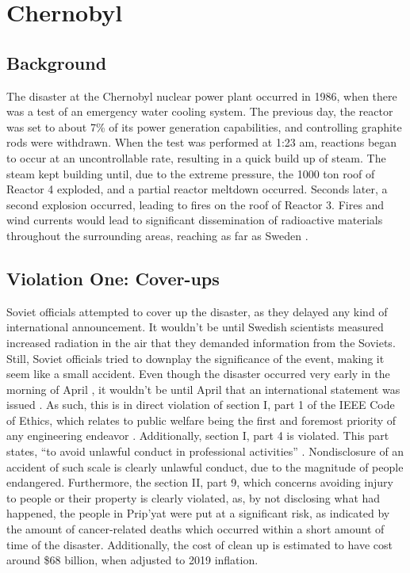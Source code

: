 \documentclass[conference]{IEEEtran}
\begin{document}
\section{Chernobyl}

\subsection{Background}

The disaster at the Chernobyl nuclear power plant occurred in 1986, when there was a test of an emergency water cooling system. The previous day, the reactor was set to about 7\% of its power generation capabilities, and controlling graphite rods were withdrawn. When the test was performed at 1:23 am, reactions began to occur at an uncontrollable rate, resulting in a quick build up of steam. The steam kept building until, due to the extreme pressure, the 1000 ton roof of Reactor 4 exploded, and a partial reactor meltdown occurred. Seconds later, a second explosion occurred, leading to fires on the roof of Reactor 3. Fires and wind currents would lead to significant dissemination of radioactive materials throughout the surrounding areas, reaching as far as Sweden \cite{b2}.

\subsection{Violation One: Cover-ups}

Soviet officials attempted to cover up the disaster, as they delayed any kind of international announcement. It wouldn't be until Swedish scientists measured increased radiation in the air that they demanded information from the Soviets. Still, Soviet officials tried to downplay the significance of the event, making it seem like a small accident. Even though the disaster occurred very early in the morning of April , it wouldn't be until April  that an international statement was issued \cite{b2}. As such, this is in direct violation of section I, part 1 of the IEEE Code of Ethics, which relates to public welfare being the first and foremost priority of any engineering endeavor \cite{b3}. Additionally, section I, part 4 is violated. This part states, ``to avoid unlawful conduct in professional activities'' \cite{b3}. Nondisclosure of an accident of such scale is clearly unlawful conduct, due to the magnitude of people endangered. Furthermore, the section II, part 9, which concerns avoiding injury to people or their property is clearly violated, as, by not disclosing what had happened, the people in Prip'yat were put at a significant risk, as indicated by the amount of cancer-related deaths which occurred within a short amount of time of the disaster. Additionally, the cost of clean up is estimated to have cost around \$68 billion, when adjusted to 2019 inflation.
\end{document}
